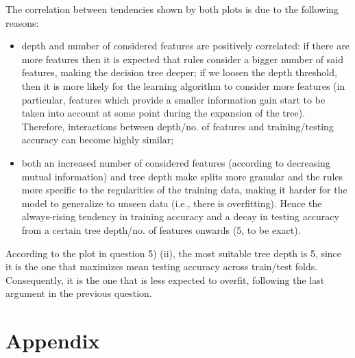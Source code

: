 \documentclass{exam}
\begin{document}
\begin{questions}
\begin{parts}
\begin{figure}[H]
            \end{figure}
        \end{parts}
        \vspace{-1em}
        \item The correlation between tendencies shown by both plots is due to the following reasons:
        \vspace{-0.4em}
        \begin{itemize}
            \item depth and number of considered features are positively correlated: if there are more features then it is expected that rules consider a bigger number of said features, making the decision tree deeper; if we loosen the depth threshold, then it is more likely for the learning algorithm to consider more features (in particular, features which provide a smaller information gain start to be taken into account at some point during the expansion of the tree). Therefore, interactions between depth/no. of features and training/testing accuracy can become highly similar;
            \item both an increased number of considered features (according to decreasing mutual information) and tree depth make splits more granular and the rules more specific to the regularities of the training data, making it harder for the model to generalize to unseen data (i.e., there is overfitting). Hence the always-rising tendency in training accuracy and a decay in testing accuracy from a certain tree depth/no. of features onwards (5, to be exact).
        \end{itemize}
        \item According to the plot in question 5) (ii), the most suitable tree depth is 5, since it is the one that maximizes mean testing accuracy across train/test folds. Consequently, it is the one that is less expected to overfit, following the last argument in the previous question. 
    \end{questions}
    \pagebreak
    \section{Appendix}
    \inputminted{python}{src/ex02.py}
    
    
\end{document}
